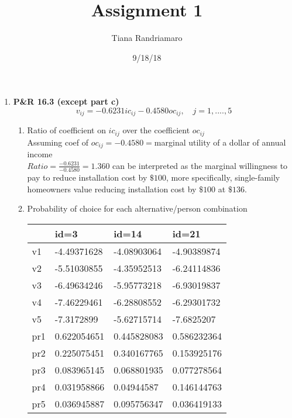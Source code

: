 \documentclass[12pt]{article}
\date{}
\title{ Assignment 1}
\author{Tiana Randriamaro}
\date{9/18/18}
\begin{document}
\maketitle

 
\begin {enumerate}
\item \textbf{P\&R 16.3 (except part c)}
\[ v_{ij} = -0.6231ic_{ij} - 0.4580oc_{ij}, \quad j = 1,....,5 \]

\begin{enumerate}
\item Ratio of coefficient on $ic_{ij}$ over the coefficient $oc_{ij}$\\
Assuming coef of $oc_{ij} = - 0.4580 = $marginal utility of a dollar of annual income\\
$Ratio = \frac{-0.6231}{- 0.4580} = 1.360$ can be interpreted as the marginal willingness to pay to reduce installation cost by $\$100$, more specifically, single-family homeowners value reducing installation cost by $\$100$ at $\$136.$

\item Probability of choice for each alternative/person combination\\

\begin{tabular}{ |p{1cm}|p{3cm}|p{3cm}|p{3cm}|  }

 \hline
  & id=3 & id=14 &id=21\\
 \hline
 v1   & -4.49371628    &-4.08903064&   -4.90389874\\
 v2 &   -5.51030855  & -4.35952513   &-6.24114836\\
 v3 &-6.49634246 & -5.95773218 &  -6.93019837\\
 v4    &-7.46229461 & -6.28808552 &  -6.29301732\\
 v5 &   -7.3172899  & -5.62715714 &-7.6825207\\
 pr1& 0.622054651  & 0.445828083   &0.586232364\\
 pr2& 0.225075451  & 0.340167765 &0.153925176\\
 pr3 &   0.083965145  & 0.068801935 &0.077278564\\
 pr4& 0.031958866  & 0.04944587   &0.146144763\\
 pr5& 0.036945887  & 0.095756347 &0.036419133\\
 \hline
\end{tabular}


\end{enumerate}
\end{enumerate}
\end{document}
